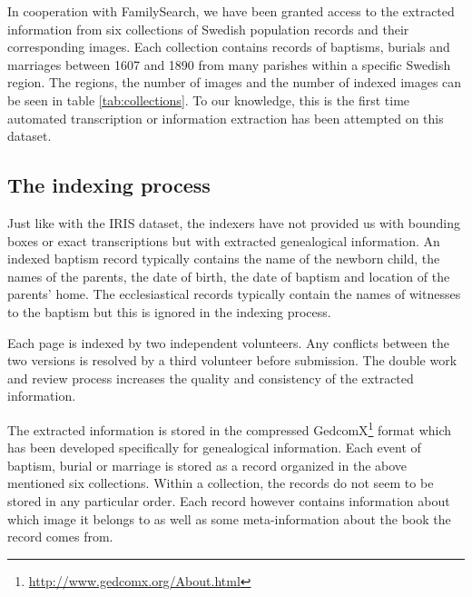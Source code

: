 

In cooperation with FamilySearch, we have been granted access to the extracted information from six collections of Swedish population records and their corresponding images.
Each collection contains records of baptisms, burials and marriages between 1607 and 1890 from many parishes within a specific Swedish region.
The regions, the number of images and the number of indexed images can be seen in table \ref{tab:collections}.
To our knowledge, this is the first time automated transcription or information extraction has been attempted on this dataset.



\subsection{The indexing process}

Just like with the IRIS dataset, the indexers have not provided us with bounding boxes or exact transcriptions but with extracted genealogical information. An indexed baptism record typically contains the name of the newborn child, the names of the parents, the date of birth, the date of baptism and location of the parents' home. The ecclesiastical records typically contain the names of witnesses to the baptism but this is ignored in the indexing process.

Each page is indexed by two independent volunteers. Any conflicts between the two versions is resolved by a third volunteer before submission.
The double work and review process increases the quality and consistency of the extracted information.

The extracted information is stored in the compressed GedcomX\footnote{\url{http://www.gedcomx.org/About.html}} format which has been developed specifically for genealogical information.
Each event of baptism, burial or marriage is stored as a record organized in the above mentioned six collections. Within a collection, the records do not seem to be stored in any particular order. Each record however contains information about which image it belongs to as well as some meta-information about the book the record comes from.

